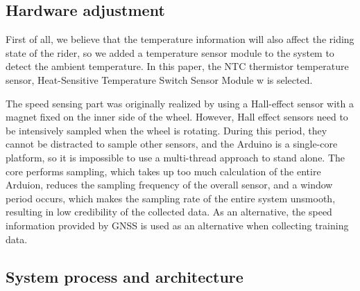 \documentclass[conference]{IEEEtran}
\begin{document}
\subsection{Hardware adjustment}

First of all, we believe that the temperature information will also affect the riding state of the rider, so we added a temperature sensor module to the system to detect the ambient temperature. In this paper, the NTC thermistor temperature sensor, Heat-Sensitive Temperature Switch Sensor Module w is selected.


The speed sensing part was originally realized by using a Hall-effect sensor with a magnet fixed on the inner side of the wheel. However, Hall effect sensors need to be intensively sampled when the wheel is rotating. During this period, they cannot be distracted to sample other sensors, and the Arduino is a single-core platform, so it is impossible to use a multi-thread approach to stand alone. The core performs sampling, which takes up too much calculation of the entire Arduion, reduces the sampling frequency of the overall sensor, and a window period occurs, which makes the sampling rate of the entire system unsmooth, resulting in low credibility of the collected data. As an alternative, the speed information provided by GNSS is used as an alternative when collecting training data.

\subsection{System process and architecture}
\end{document}
